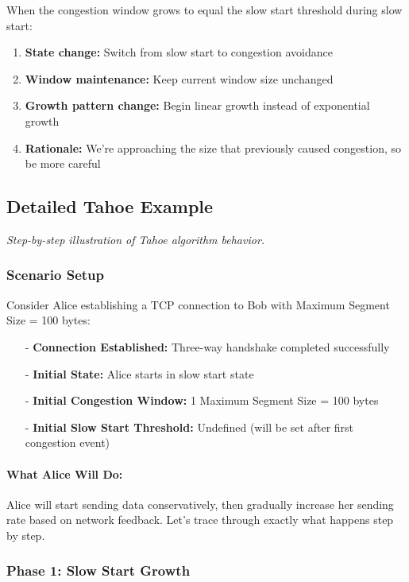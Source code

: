 \documentclass[../../compsys.tex]{subfiles}
\begin{document}
When the congestion window grows to equal the slow start threshold during slow start:

\begin{enumerate}
  \item \textbf{State change:} Switch from slow start to congestion avoidance
  \item \textbf{Window maintenance:} Keep current window size unchanged
  \item \textbf{Growth pattern change:} Begin linear growth instead of exponential growth
  \item \textbf{Rationale:} We're approaching the size that previously caused congestion, so be more careful
\end{enumerate}

\subsection{Detailed Tahoe Example}
\textit{Step-by-step illustration of Tahoe algorithm behavior.}

\subsubsection{Scenario Setup}
Consider Alice establishing a TCP connection to Bob with Maximum Segment Size = 100 bytes:

\begin{itemize}
  \item[-] \textbf{Connection Established:} Three-way handshake completed successfully
  \item[-] \textbf{Initial State:} Alice starts in slow start state
  \item[-] \textbf{Initial Congestion Window:} 1 Maximum Segment Size = 100 bytes
  \item[-] \textbf{Initial Slow Start Threshold:} Undefined (will be set after first congestion event)
\end{itemize}

\paragraph{What Alice Will Do:}
Alice will start sending data conservatively, then gradually increase her sending rate based on network feedback. Let's trace through exactly what happens step by step.

\subsubsection{Phase 1: Slow Start Growth}
\end{document}
